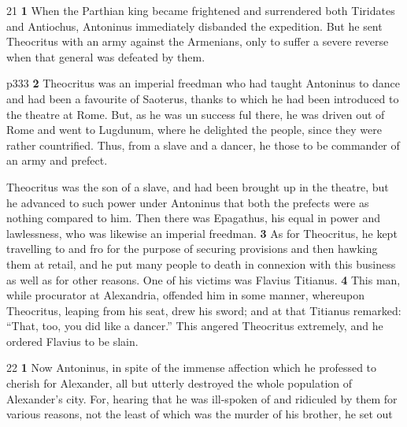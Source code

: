 21
\textbf{1} When the Parthian king became frightened and surrendered both Tiridates and Antiochus, Antoninus immediately disbanded the expedition. But he sent Theocritus with an army against the Armenians, only to suffer a severe reverse when that general was defeated by them.

p333
\textbf{2} Theocritus was an imperial freedman who had taught Antoninus to dance and had been a favourite of Saoterus, thanks to which he had been introduced to the theatre at Rome. But, as he was un­ success ­ful there, he was driven out of Rome and went to Lugdunum, where he delighted the people, since they were rather countrified. Thus, from a slave and a dancer, he those to be commander of an army and prefect.

Theocritus was the son of a slave, and had been brought up in the theatre, but he advanced to such power under Antoninus that both the prefects were as nothing compared to him. Then there was Epagathus, his equal in power and lawlessness, who was likewise an imperial freedman. \textbf{3} As for Theocritus, he kept travelling to and fro for the purpose of securing provisions and then hawking them at retail, and he put many people to death in connexion with this business as well as for other reasons. One of his victims was Flavius Titianus. \textbf{4} This man, while procurator at Alexandria, offended him in some manner, whereupon Theocritus, leaping from his seat, drew his sword; and at that Titianus remarked: ``That, too, you did like a dancer.'' This angered Theocritus extremely, and he ordered Flavius to be slain.

22
\textbf{1} Now Antoninus, in spite of the immense affection which he professed to cherish for Alexander, all but utterly destroyed the whole population of Alexander's city. For, hearing that he was ill-spoken of and ridiculed by them for various reasons, not the least of which was the murder of his brother, he set out

